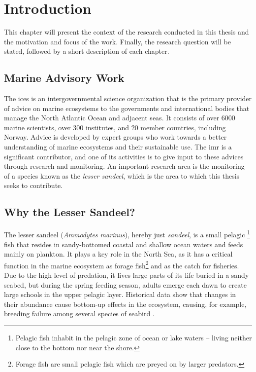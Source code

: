 \chapter{Introduction}
    This chapter will present the context of the research conducted in this thesis and the motivation and focus of the work. Finally, the research question will be stated, followed by a short description of each chapter. 
    
    
    

\section{Marine Advisory Work}
    The \gls{ices} is an intergovernmental science organization that is the primary provider of advice on marine ecosystems to the governments and international bodies that manage the North Atlantic Ocean and adjacent seas\cite{ICES2020}. It consists of over 6000 marine scientists, over 300 institutes, and 20 member countries, including Norway. Advice is developed by expert groups who work towards a better understanding of marine ecosystems and their sustainable use. The \gls{imr} is a significant  contributor, and one of its activities is to give input to these advices through research and monitoring. An important research area is the monitoring of a species known as the \textit{lesser sandeel}, which is the area to which this thesis seeks to contribute.
    
\section{Why the Lesser Sandeel?}
    The lesser sandeel (\textit{Ammodytes marinus}), hereby just \textit{sandeel}, is
    a small pelagic \footnote{Pelagic fish inhabit in the pelagic zone of ocean or lake waters – living neither close to the bottom nor near the shore.} fish that resides in sandy-bottomed coastal and shallow ocean waters and feeds mainly on plankton. It plays a key role in the North Sea, as it has a critical function in the marine ecosystem as forage fish\footnote{Forage fish are small pelagic fish which are preyed on by larger predators.} and as the catch for fisheries. Due to the high level of predation, it lives large parts of its life buried in a sandy seabed, but during the spring feeding season, adults emerge each dawn to create large schools in the upper pelagic layer. Historical data show that changes in their abundance cause bottom-up effects in the ecosystem, causing, for example, breeding failure among several species of seabird \cite{johnsen2017collective}. 
    
